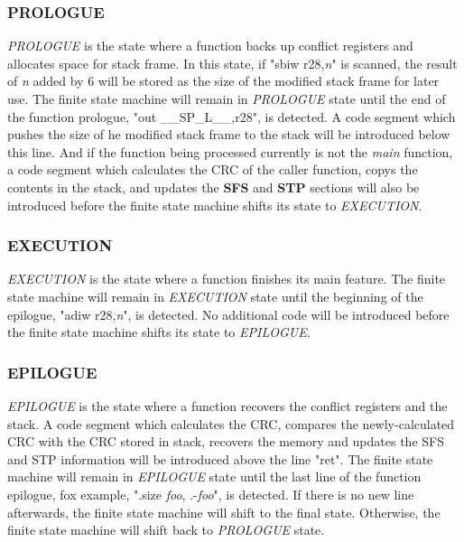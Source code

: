 \subsubsection{PROLOGUE} 
\textit{PROLOGUE} is the state where a function backs up conflict registers and allocates space for stack frame. In this state, if "sbiw r28,\textit{n}" is scanned, the result of \textit{n} added by 6 will be stored as the size of the modified stack frame for later use.  The finite state machine will remain in \textit{PROLOGUE} state until the end of the function prologue, "out \_\_SP\_L\_\_,r28", is detected. A code segment which pushes the size of he modified stack frame to the stack will be introduced below this line. And if the function being processed currently is not the \textit{main} function, a code segment which calculates the CRC of the caller function, copys the contents in the stack, and updates the \textbf{SFS} and \textbf{STP} sections will also be introduced before the finite state machine shifts its state to \textit{EXECUTION}.

\subsubsection{EXECUTION} 
\textit{EXECUTION} is the state where a function finishes its main feature. The finite state machine will remain in \textit{EXECUTION} state until the beginning of the epilogue, "adiw r28,\textit{n}", is detected.  No additional code will be introduced before the finite state machine shifts its state to \textit{EPILOGUE}.

\subsubsection{EPILOGUE}
\textit{EPILOGUE} is the state where a function recovers the conflict registers and the stack. A code segment which calculates the CRC, compares the newly-calculated CRC with the CRC stored in stack, recovers the memory and updates the SFS and STP information will be introduced above the line "ret". The finite state machine will remain in \textit{EPILOGUE} state until the last line of the function epilogue, fox example, ".size	\textit{foo}, .-\textit{foo}", is detected. If there is no new line afterwards, the finite state machine will shift to the final state. Otherwise, the finite state machine will shift back to \textit{PROLOGUE} state.